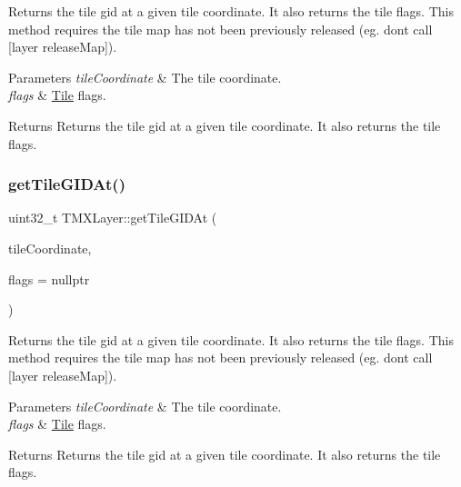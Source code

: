 Returns the tile gid at a given tile coordinate. It also returns the tile flags. This method requires the tile map has not been previously released (eg. don\textquotesingle{}t call \mbox{[}layer release\+Map\mbox{]}).


\begin{DoxyParams}{Parameters}
{\em tile\+Coordinate} & The tile coordinate. \\
\hline
{\em flags} & \hyperlink{structTile}{Tile} flags. \\
\hline
\end{DoxyParams}
\begin{DoxyReturn}{Returns}
Returns the tile gid at a given tile coordinate. It also returns the tile flags. 
\end{DoxyReturn}
\mbox{\label{classTMXLayer_a0a3f3e283a4a654aae4e4e4761e386eb}} 
\subsubsection{\texorpdfstring{get\+Tile\+G\+I\+D\+At()}{getTileGIDAt()}\hspace{0.1cm}{\footnotesize\ttfamily [2/2]}}
{\footnotesize\ttfamily uint32\+\_\+t T\+M\+X\+Layer\+::get\+Tile\+G\+I\+D\+At (\begin{DoxyParamCaption}\item[{const \hyperlink{classVec2}{Vec2} \&}]{tile\+Coordinate,  }\item[{T\+M\+X\+Tile\+Flags $\ast$}]{flags = {\ttfamily nullptr} }\end{DoxyParamCaption})}

Returns the tile gid at a given tile coordinate. It also returns the tile flags. This method requires the tile map has not been previously released (eg. don\textquotesingle{}t call \mbox{[}layer release\+Map\mbox{]}).


\begin{DoxyParams}{Parameters}
{\em tile\+Coordinate} & The tile coordinate. \\
\hline
{\em flags} & \hyperlink{structTile}{Tile} flags. \\
\hline
\end{DoxyParams}
\begin{DoxyReturn}{Returns}
Returns the tile gid at a given tile coordinate. It also returns the tile flags. 
\end{DoxyReturn}
\mbox{\label{classTMXLayer_a99a6fdaff73922809a3b2edbeb6d15e8}} 
